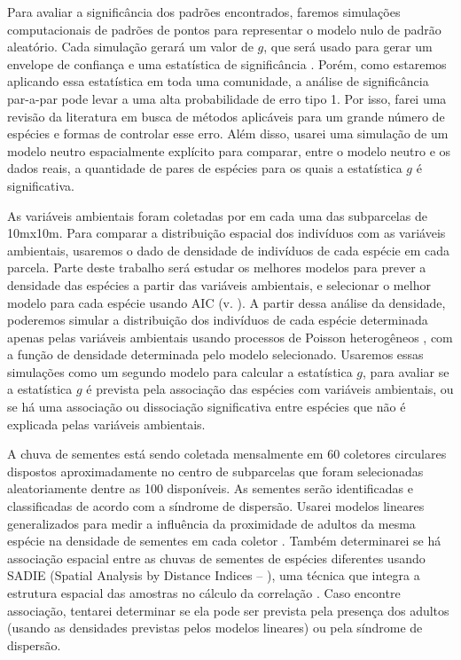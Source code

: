 \documentclass[twoside,12pt,a4paper]{report}
\begin{document}
Para avaliar a significância dos padrões encontrados, faremos simulações computacionais de padrões
de pontos para representar o modelo nulo de padrão aleatório. Cada simulação gerará um valor de
$g$, que será usado para gerar um envelope de confiança e uma estatística de significância
\citep{IllianBook,DiggleBook}. Porém, como estaremos aplicando essa estatística em toda uma
comunidade, a análise de significância par-a-par pode levar a uma alta probabilidade de erro tipo 1.
Por isso, farei uma revisão da literatura em busca de métodos aplicáveis para um grande número de
espécies e formas de controlar esse erro. Além disso, usarei uma simulação de um modelo neutro
espacialmente explícito para comparar, entre o modelo neutro e os dados reais, a quantidade de pares de espécies para os quais a estatística
$g$ é significativa.

As variáveis ambientais foram coletadas por \cite{Kelly} em cada uma das subparcelas de 10mx10m.
Para comparar a distribuição espacial dos indivíduos com as variáveis ambientais, usaremos o dado de
densidade de indivíduos de cada espécie em cada parcela. Parte deste trabalho será estudar os
melhores modelos para prever a densidade das espécies a partir das variáveis ambientais, e
selecionar o melhor modelo para cada espécie usando AIC (v. \cite{Bagchi2011,Henrys2009}). A partir
dessa análise da densidade, poderemos simular a distribuição dos indivíduos de cada espécie
determinada apenas pelas variáveis ambientais usando processos de Poisson heterogêneos
\citep{WiegandBook}, com a função de densidade determinada pelo modelo selecionado. Usaremos essas
simulações como um segundo modelo para calcular a estatística $g$, para avaliar se a
estatística $g$ é prevista pela associação das espécies com variáveis ambientais, ou se há uma
associação ou dissociação significativa entre espécies que não é explicada pelas variáveis
ambientais.

A chuva de sementes está sendo coletada mensalmente em 60 coletores circulares dispostos
aproximadamente no centro de subparcelas que foram selecionadas aleatoriamente dentre as 100
disponíveis. As sementes serão identificadas e classificadas de acordo com a síndrome de dispersão.
Usarei modelos lineares generalizados para medir a influência da proximidade de adultos da mesma
espécie na densidade de sementes em cada coletor \citep{Hardesty2002}. Também determinarei se há
associação espacial entre as
chuvas de sementes de espécies diferentes usando SADIE (Spatial Analysis by Distance Indices –
\cite{Perry1995}), uma técnica que integra a estrutura espacial das amostras no cálculo da
correlação \citep{Li2012}. Caso encontre associação, tentarei determinar se ela pode ser prevista pela presença dos adultos (usando as densidades previstas pelos
modelos lineares) ou pela síndrome de dispersão.
\end{document}
